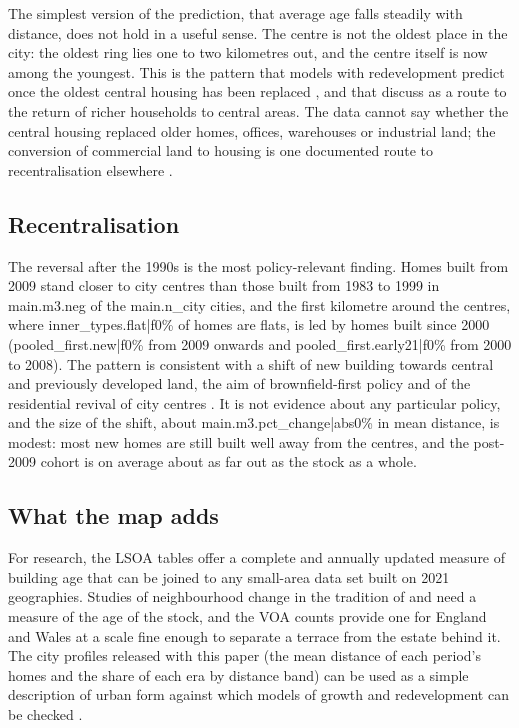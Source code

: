 The simplest version of the prediction, that average age falls steadily with distance, does not hold in a useful sense. The centre is not the oldest place in the city: the oldest ring lies one to two kilometres out, and the centre itself is now among the youngest. This is the pattern that models with redevelopment predict once the oldest central housing has been replaced \citep{wheaton1982,braid2001}, and that \citet{brueckner2009} discuss as a route to the return of richer households to central areas. The data cannot say whether the central housing replaced older homes, offices, warehouses or industrial land; the conversion of commercial land to housing is one documented route to recentralisation elsewhere \citep{xu2023}.

\subsection{Recentralisation}
The reversal after the 1990s is the most policy-relevant finding. Homes built from 2009 stand closer to city centres than those built from 1983 to 1999 in {{main.m3.neg}} of the {{main.n_city}} cities, and the first kilometre around the centres, where {{inner_types.flat|f0}}\% of homes are flats, is led by homes built since 2000 ({{pooled_first.new|f0}}\% from 2009 onwards and {{pooled_first.early21|f0}}\% from 2000 to 2008). The pattern is consistent with a shift of new building towards central and previously developed land, the aim of brownfield-first policy \citep{wong2010} and of the residential revival of city centres \citep{bromley2005}. It is not evidence about any particular policy, and the size of the shift, about {{main.m3.pct_change|abs0}}\% in mean distance, is modest: most new homes are still built well away from the centres, and the post-2009 cohort is on average about as far out as the stock as a whole.

\subsection{What the map adds}
For research, the LSOA tables offer a complete and annually updated measure of building age that can be joined to any small-area data set built on 2021 geographies. Studies of neighbourhood change in the tradition of \citet{rosenthal2008} and \citet{brueckner2009} need a measure of the age of the stock, and the VOA counts provide one for England and Wales at a scale fine enough to separate a terrace from the estate behind it. The city profiles released with this paper (the mean distance of each period's homes and the share of each era by distance band) can be used as a simple description of urban form against which models of growth and redevelopment can be checked \citep{harrison1974,wheaton1982,hanlon2022}.

